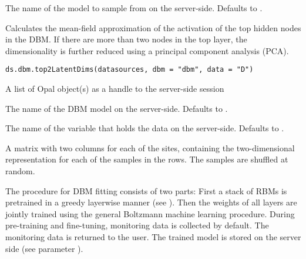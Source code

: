 %
\begin{Arguments}
\begin{ldescription}
\item[\code{dbm}] The name of the model to sample from on the server-side. Defaults to .
\end{ldescription}
\end{Arguments}
%
\begin{Description}\relax
Calculates the mean-field approximation of the activation of the top hidden nodes in
the DBM. If there are more than two nodes in the top layer, the dimensionality is further
reduced using a principal component analysis (PCA).
\end{Description}
%
\begin{Usage}
\begin{verbatim}
ds.dbm.top2LatentDims(datasources, dbm = "dbm", data = "D")
\end{verbatim}
\end{Usage}
%
\begin{Arguments}
\begin{ldescription}
\item[\code{datasources}] A list of Opal object(s) as a handle to the server-side session

\item[\code{dbm}] The name of the DBM model on the server-side. Defaults to .

\item[\code{data}] The name of the variable that holds the data on the server-side.
Defaults to .
\end{ldescription}
\end{Arguments}
%
\begin{Value}
A matrix with two columns for each of the sites,
containing the two-dimensional representation for
each of the samples in the rows. The samples are shuffled at random.
\end{Value}
%
\begin{Description}\relax
The procedure for DBM fitting consists of two parts:
First a stack of RBMs is pretrained in a greedy layerwise manner
(see ). Then the weights of all layers are jointly
trained using the general Boltzmann machine learning procedure.
During pre-training and fine-tuning, monitoring data is collected by default.
The monitoring data is returned to the user.
The trained model is stored on the server side (see parameter ).
\end{Description}
